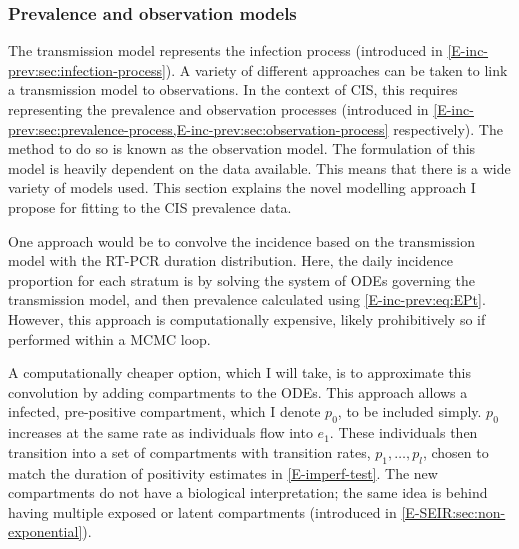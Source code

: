 \documentclass[thesis.tex]{subfiles}
\begin{document}
\subsubsection{Prevalence and observation models} \label{SEIR:sec:observation}


The transmission model represents the infection process (introduced in \cref{E-inc-prev:sec:infection-process}).
A variety of different approaches can be taken to link a transmission model to observations.
In the context of CIS, this requires representing the prevalence and observation processes (introduced in \cref{E-inc-prev:sec:prevalence-process,E-inc-prev:sec:observation-process} respectively).
The method to do so is known as the observation model.
The formulation of this model is heavily dependent on the data available.
This means that there is a wide variety of models used.
This section  explains the novel modelling approach I propose for fitting to the CIS prevalence data.

One approach would be to convolve the incidence based on the transmission model with the RT-PCR duration distribution.
Here, the daily incidence proportion for each stratum is by solving the system of ODEs governing the transmission model, and then prevalence calculated using \cref{E-inc-prev:eq:EPt}.
However, this approach is computationally expensive, likely prohibitively so if performed within a MCMC loop.

A computationally cheaper option, which I will take, is to approximate this convolution by adding compartments to the ODEs.
This approach allows a infected, pre-positive compartment, which I denote $p_0$, to be included simply.
$p_0$ increases at the same rate as individuals flow into $e_1$.
These individuals then transition into a set of compartments with transition rates, $p_1, \dots, p_l$, chosen to match the duration of positivity estimates in \cref{E-imperf-test}.
The new compartments do not have a biological interpretation; the same idea is behind having multiple exposed or latent compartments (introduced in \cref{E-SEIR:sec:non-exponential}).
\end{document}
